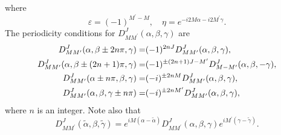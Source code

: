 where
\begin{equation}
\varepsilon=(-1)^{M^{\prime}-M}, \quad \eta=e^{-i 2 M \alpha-i 2 M^{\prime} \gamma}.\label{eq:4:4:3}
\end{equation}
The periodicity conditions for $D_{M M^{\prime}}^{J}(\alpha, \beta, \gamma)$ are
\begin{align}
D_{M M^{\prime}}^{J}(\alpha, \beta \pm 2 n \pi, \gamma)=&(-1)^{2 n J} D_{M M^{\prime}}^{J}(\alpha, \beta, \gamma) , \notag\\
D_{M M^{\prime}}^{J}(\alpha, \beta \pm(2 n+1) \pi, \gamma)=&(-1)^{ \pm(2 n+1) J-M^{\prime}} D_{M-M^{\prime}}^{J}(\alpha, \beta,-\gamma) , \label{eq:4:4:4}\\
D_{M M^{\prime}}^{J}(\alpha \pm n \pi, \beta, \gamma)=&(-i)^{ \pm 2 n M} D_{M M^{\prime}}^{J}(\alpha, \beta, \gamma)  ,\notag\\
D_{M M^{\prime}}^{J}(\alpha, \beta, \gamma \pm n \pi)=&(-i)^{ \pm 2 n M^{\prime}} D_{M M^{\prime}}^{J}(\alpha, \beta, \gamma) ,\notag
\end{align}
where $n$ is an integer. Note also that
\begin{equation}
D_{M M^{\prime}}^{J}(\tilde{\alpha}, \beta, \tilde{\gamma})=e^{i M(\alpha-\tilde{\alpha})} D_{M M^{\prime}}^{J}(\alpha, \beta, \gamma) e^{i M^{\prime}(\gamma-\tilde{\gamma})} .\label{eq:4:4:5}
\end{equation}
